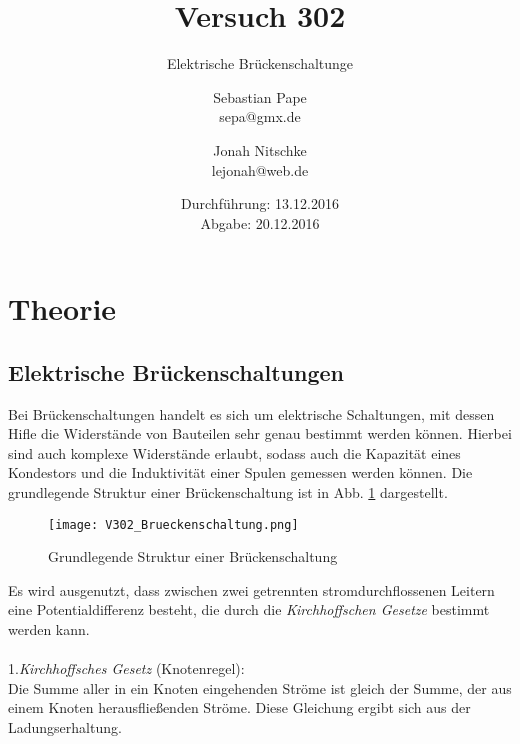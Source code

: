 

\title{Versuch 302}
\subtitle{Elektrische Brückenschaltunge}
\author{Sebastian Pape\\
        sepa@gmx.de \and
        Jonah Nitschke\\
        lejonah@web.de}
\date{Durchführung: 13.12.2016\\
      Abgabe: 20.12.2016}


\maketitle
\setcounter{page}{1}
\section{Theorie}

\subsection{Elektrische Brückenschaltungen}

Bei Brückenschaltungen handelt es sich um elektrische Schaltungen, mit dessen
Hifle die Widerstände von Bauteilen sehr genau bestimmt werden können.
Hierbei sind auch komplexe Widerstände erlaubt, sodass auch die Kapazität eines
Kondestors und die Induktivität einer Spulen gemessen werden können.
Die grundlegende Struktur einer Brückenschaltung ist in Abb. \ref{fig:Brückenschaltung}
dargestellt.

\begin{figure}
  \centering
  \texttt{[image: V302\_Brueckenschaltung.png]}
  \caption{Grundlegende Struktur einer Brückenschaltung\cite{anleitung01}}
  \label{fig:Brückenschaltung}
\end{figure}

Es wird ausgenutzt, dass zwischen zwei getrennten stromdurchflossenen
Leitern eine Potentialdifferenz besteht, die durch die \emph{Kirchhoffschen Gesetze}
bestimmt werden kann.\\\\

1.\emph{Kirchhoffsches Gesetz} (Knotenregel):\\
Die Summe aller in ein Knoten eingehenden Ströme ist gleich der Summe, der aus
einem Knoten herausfließenden Ströme. Diese Gleichung ergibt sich aus der
Ladungserhaltung.

